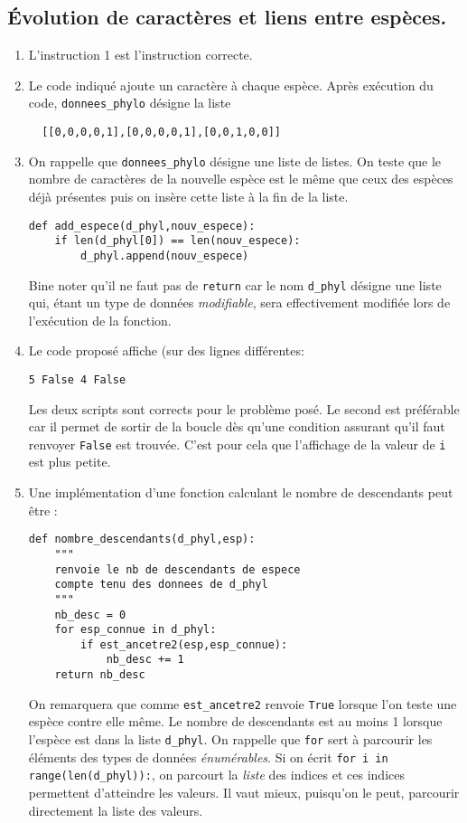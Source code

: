 \subsection{\'Evolution de caractères et liens entre espèces.}
\begin{enumerate}
  \item L'instruction 1 est l'instruction correcte.
  \item Le code indiqué ajoute un caractère à chaque espèce. Après exécution du code, \verb|donnees_phylo| désigne la liste
\begin{verbatim}
  [[0,0,0,0,1],[0,0,0,0,1],[0,0,1,0,0]]
\end{verbatim}

  \item On rappelle que \verb|donnees_phylo| désigne une liste de listes. On teste que le nombre de caractères de la nouvelle espèce est le même que ceux des espèces déjà présentes puis on insère cette liste à la fin de la liste. 
\begin{verbatim}
def add_espece(d_phyl,nouv_espece):
    if len(d_phyl[0]) == len(nouv_espece):
        d_phyl.append(nouv_espece)
\end{verbatim}
Bine noter qu'il ne faut pas de \verb|return| car le nom \verb|d_phyl| désigne une liste qui, étant un type de données \emph{modifiable}, sera effectivement modifiée lors de l'exécution de la fonction.
  \item Le code proposé affiche (sur des lignes différentes:
\begin{verbatim}
5 False 4 False
\end{verbatim}
Les deux scripts sont corrects pour le problème posé. Le second est préférable car il permet de sortir de la boucle dès qu'une condition assurant qu'il faut renvoyer \verb|False| est trouvée. C'est pour cela que l'affichage de la valeur de \verb|i| est plus petite.
  \item Une implémentation d'une fonction calculant le nombre de descendants peut être :
\begin{verbatim}
def nombre_descendants(d_phyl,esp):
    """
    renvoie le nb de descendants de espece
    compte tenu des donnees de d_phyl
    """
    nb_desc = 0
    for esp_connue in d_phyl:
        if est_ancetre2(esp,esp_connue):
            nb_desc += 1
    return nb_desc
\end{verbatim}
On remarquera que comme \verb|est_ancetre2| renvoie \verb|True| lorsque l'on teste une espèce contre elle même. Le nombre de descendants est au moins 1 lorsque l'espèce est dans la liste \verb|d_phyl|.\newline
On rappelle que \verb|for| sert à parcourir les éléments des types de données \emph{énumérables}. Si on écrit \verb|for i in range(len(d_phyl)):|, on parcourt la \emph{liste} des indices et ces indices permettent d'atteindre les valeurs. Il vaut mieux, puisqu'on le peut, parcourir directement la liste des valeurs.
\end{enumerate}

